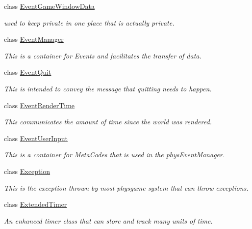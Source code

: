 \begin{DoxyCompactItemize}
class \hyperlink{classphys_1_1EventGameWindowData}{EventGameWindowData}
\begin{DoxyCompactList}\small\item\em used to keep private in one place that is actually private. \item\end{DoxyCompactList}\item 
class \hyperlink{classphys_1_1EventManager}{EventManager}
\begin{DoxyCompactList}\small\item\em This is a container for Events and facilitates the transfer of data. \item\end{DoxyCompactList}\item 
class \hyperlink{classphys_1_1EventQuit}{EventQuit}
\begin{DoxyCompactList}\small\item\em This is intended to convey the message that quitting needs to happen. \item\end{DoxyCompactList}\item 
class \hyperlink{classphys_1_1EventRenderTime}{EventRenderTime}
\begin{DoxyCompactList}\small\item\em This communicates the amount of time since the world was rendered. \item\end{DoxyCompactList}\item 
class \hyperlink{classphys_1_1EventUserInput}{EventUserInput}
\begin{DoxyCompactList}\small\item\em This is a container for MetaCodes that is used in the physEventManager. \item\end{DoxyCompactList}\item 
class \hyperlink{classphys_1_1Exception}{Exception}
\begin{DoxyCompactList}\small\item\em This is the exception thrown by most physgame system that can throw exceptions. \item\end{DoxyCompactList}\item 
class \hyperlink{classphys_1_1ExtendedTimer}{ExtendedTimer}
\begin{DoxyCompactList}\small\item\em An enhanced timer class that can store and track many units of time. \item\end{DoxyCompactList}\item 

\end{DoxyCompactItemize}
